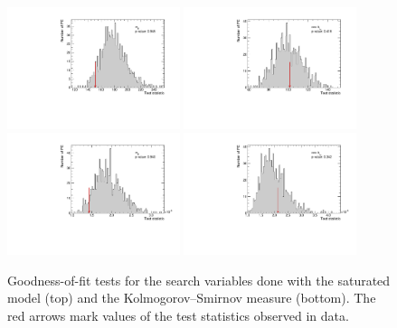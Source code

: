 \begin{figure}
  \centering
  \includegraphics[width=0.45\textwidth]{fig/chapt7/stat/gof/MassTT_saturated.pdf}
  \includegraphics[width=0.45\textwidth]{fig/chapt7/stat/gof/CosTopLepTT_saturated.pdf} \\
  \includegraphics[width=0.45\textwidth]{fig/chapt7/stat/gof/MassTT_KS.pdf}
  \includegraphics[width=0.45\textwidth]{fig/chapt7/stat/gof/CosTopLepTT_KS.pdf}
  \caption{Goodness-of-fit tests for the search variables done with the saturated model (top) and the Kolmogorov--Smirnov measure (bottom). The red arrows mark values of the test statistics observed in data.}
  \label{Fig:GoF}
\end{figure}

